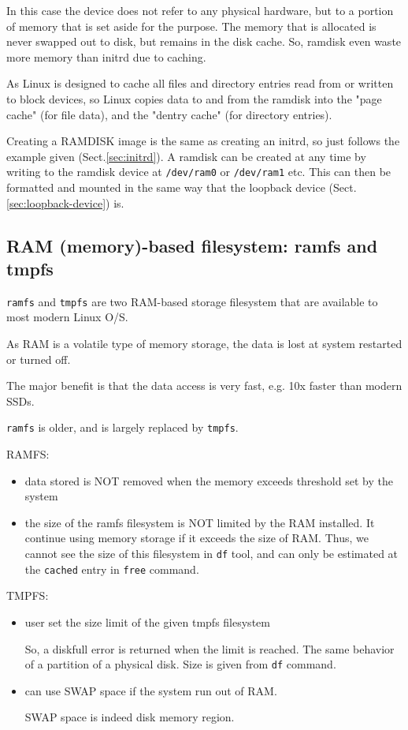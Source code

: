 In this case the device does not refer to any physical hardware, but to a
portion of memory that is set aside for the purpose. The memory that is
allocated is never swapped out to disk, but remains in the disk cache.
So, ramdisk even waste more memory than initrd due to caching.

As Linux is designed to cache all files and directory entries read from or
written to block devices, so Linux copies data to and from the ramdisk into the
"page cache" (for file data), and the "dentry cache" (for directory entries).

Creating a RAMDISK image is the same as creating an initrd, so just follows the
example given (Sect.\ref{sec:initrd}). A ramdisk can be created at any time by
writing to the ramdisk device at \verb!/dev/ram0! or \verb!/dev/ram1! etc. This
can then be formatted and mounted in the same way that the loopback device
(Sect.\ref{sec:loopback-device}) is.


\subsection{RAM (memory)-based filesystem: ramfs and tmpfs}


\verb!ramfs! and \verb!tmpfs! are two RAM-based storage filesystem that are
available to most modern Linux O/S.

As RAM is a volatile type of memory storage, the data is lost at system
restarted or turned off. 

The major benefit is that the data access is very fast, e.g. 10x faster than
modern SSDs.

\verb!ramfs! is older, and is largely replaced by \verb!tmpfs!.

RAMFS:
\begin{itemize}
  \item data stored is NOT removed when the memory exceeds threshold set by the system
  
  \item the size of the ramfs filesystem is NOT limited by the RAM installed. It continue using memory storage
  if it exceeds the size of RAM. Thus, we cannot see the size of this filesystem in \verb!df! tool, and can 
  only be estimated at the \verb!cached! entry in \verb!free! command.
\end{itemize}

TMPFS:
\begin{itemize}
  \item user set the size limit of the given tmpfs filesystem
  
  So, a diskfull error is returned when the limit is reached. The same behavior of a partition of a physical disk.
  Size is given from \verb!df! command.
  
  \item can use SWAP space if the system run out of RAM.
  
  SWAP space is indeed disk memory region.
\end{itemize}

